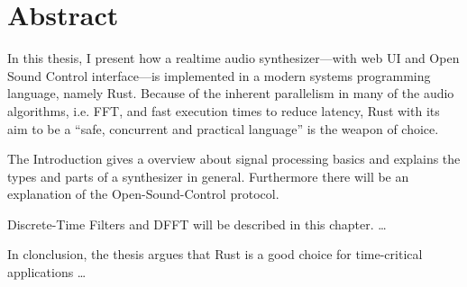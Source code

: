 \section*{Abstract}\label{abstract}

\sffamily{
	\begin{center}
		\textbf{\documentAuthor{}}\\
		\textsc{\university{}}\\
        \universityFaculty{}---\universityDepartment{}\\
		\documentTitle{}\\
		\germanDate{}\today{}\\
		\bigskip{}
	\end{center}
}

In this thesis, I present how a realtime audio synthesizer---with web UI and Open Sound Control interface---is implemented in a modern systems programming language, namely Rust. Because of the inherent parallelism in many of the audio algorithms, i.e. FFT, and fast execution times to reduce latency, Rust with its aim to be a \enquote{safe, concurrent and practical language} is the weapon of choice.

The Introduction gives a overview about signal processing basics and explains the types and parts of a synthesizer in general. Furthermore there will be an explanation of the Open-Sound-Control protocol.

Discrete-Time Filters and DFFT will be described in this chapter.
\ldots

In clonclusion, the thesis argues that Rust is a good choice for time-critical applications \ldots




